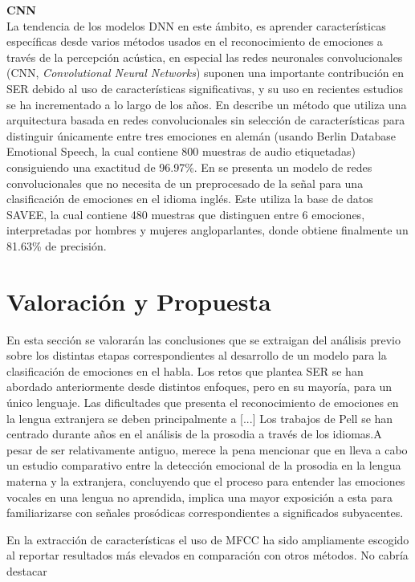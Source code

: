 \documentclass[11pt,a4paper,spanish]{book}
\begin{document}
	\textbf{CNN}\\
	La tendencia de los modelos DNN en este ámbito, es aprender características específicas desde varios métodos usados en el reconocimiento de emociones a través de la percepción acústica, en especial las redes neuronales convolucionales (CNN, \emph{Convolutional Neural Networks}) suponen una importante contribución en SER debido al uso de características significativas, y su uso en recientes estudios se ha incrementado a lo largo de los años.
	En \cite{Harar2017} describe un método que utiliza una arquitectura basada en redes convolucionales sin selección de características para distinguir únicamente entre tres emociones en alemán (usando Berlin Database Emotional Speech, la cual contiene 800 muestras de audio etiquetadas) consiguiendo una exactitud de 96.97\%. En \cite{AbdulQayyum2019} se presenta un modelo de redes convolucionales que no necesita de un preprocesado de la señal para una clasificación de emociones en el idioma inglés. Este utiliza la base de datos SAVEE, la cual contiene 480 muestras que distinguen entre 6 emociones, interpretadas por hombres y mujeres angloparlantes, donde obtiene finalmente un 81.63\% de precisión.\newline
	
	\section{Valoración y Propuesta}
	En esta sección se valorarán las conclusiones que se extraigan del análisis previo sobre los distintas etapas correspondientes al desarrollo de un modelo para la clasificación de emociones en el habla. Los retos que plantea SER se han abordado anteriormente desde distintos enfoques, pero en su mayoría, para un único lenguaje. Las dificultades que presenta el reconocimiento de emociones en la lengua extranjera se deben principalmente a [...]
	Los trabajos de Pell se han centrado durante años en el análisis de la prosodia a través de los idiomas.A pesar de ser relativamente antiguo, merece la pena mencionar que en \cite{Pell2008} lleva a cabo un estudio comparativo entre la detección emocional de la prosodia en la lengua materna y la extranjera, concluyendo que el proceso para entender las emociones vocales en una lengua no aprendida, implica una mayor exposición a esta para familiarizarse con señales prosódicas correspondientes a significados subyacentes. 
	
	En la extracción de características el uso de MFCC ha sido ampliamente escogido al reportar resultados más elevados en comparación con otros métodos. No cabría destacar
	
	
	\printbibliography
	
\end{document}
